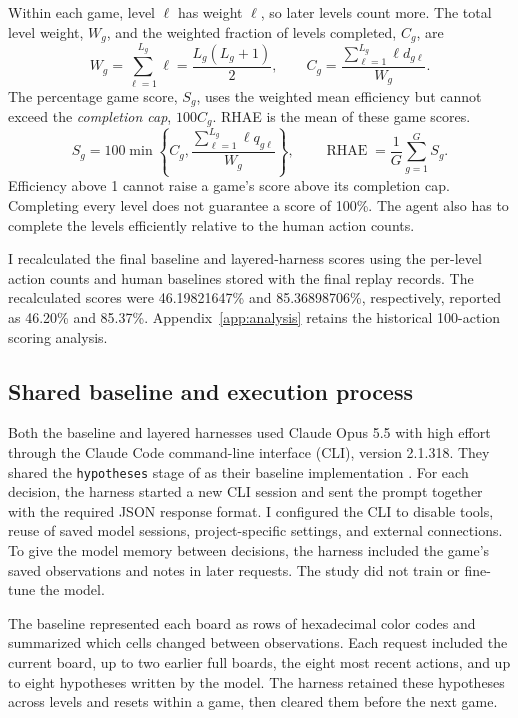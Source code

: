 Within each game, level $\ell$ has weight $\ell$, so later levels count more. The total level weight, $W_g$, and the weighted fraction of levels completed, $C_g$, are
\begin{equation}
W_g=\sum_{\ell=1}^{L_g}\ell=\frac{L_g(L_g+1)}{2},\qquad
C_g=\frac{\sum_{\ell=1}^{L_g}\ell d_{g\ell}}{W_g}.\label{eq:completion}
\end{equation}
The percentage game score, $S_g$, uses the weighted mean efficiency but cannot exceed the \emph{completion cap}, $100C_g$. RHAE is the mean of these game scores.
\begin{equation}
S_g=100\min\left\{C_g,\frac{\sum_{\ell=1}^{L_g}\ell q_{g\ell}}{W_g}\right\},\qquad
\operatorname{RHAE}=\frac{1}{G}\sum_{g=1}^{G}S_g.\label{eq:score}
\end{equation}
Efficiency above 1 cannot raise a game's score above its completion cap. Completing every level does not guarantee a score of 100\%. The agent also has to complete the levels efficiently relative to the human action counts.

I recalculated the final baseline and layered-harness scores using the per-level action counts and human baselines stored with the final replay records. The recalculated scores were 46.19821647\% and 85.36898706\%, respectively, reported as 46.20\% and 85.37\%. Appendix~\ref{app:analysis} retains the historical 100-action scoring analysis.

\subsection{Shared baseline and execution process}\label{sec:harness}
Both the baseline and layered harnesses used Claude Opus 5.5 with high effort through the Claude Code command-line interface (CLI), version 2.1.318. They shared the \texttt{hypotheses} stage of  as their baseline implementation \citep{dai2026code,dai2026layered}. For each decision, the harness started a new CLI session and sent the prompt together with the required JSON response format. I configured the CLI to disable tools, reuse of saved model sessions, project-specific settings, and external connections. To give the model memory between decisions, the harness included the game's saved observations and notes in later requests. The study did not train or fine-tune the model.


The baseline represented each board as rows of hexadecimal color codes and summarized which cells changed between observations. Each request included the current board, up to two earlier full boards, the eight most recent actions, and up to eight hypotheses written by the model. The harness retained these hypotheses across levels and resets within a game, then cleared them before the next game.

